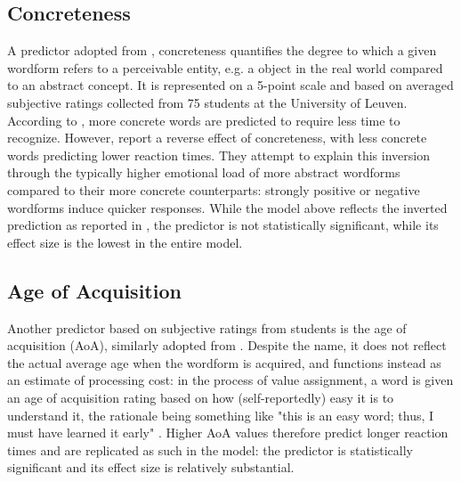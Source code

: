 \subsection{Concreteness} \label{subsec:concreteness}
A predictor adopted from \cite{Brysbaert+etal+2014}, concreteness quantifies the degree to which a given wordform refers to a perceivable entity, e.g. a object in the real world compared to an abstract concept. It is represented on a 5-point scale and based on averaged subjective ratings collected from 75 students at the University of Leuven. According to \cite{Brysbaert+etal+2014}, more concrete words are predicted to require less time to recognize. However, \cite{Brysbaert+etal+2016} report a reverse effect of concreteness, with less concrete words predicting lower reaction times. They attempt to explain this inversion through the typically higher emotional load of more abstract wordforms compared to their more concrete counterparts: strongly positive or negative wordforms induce quicker responses. While the model above reflects the inverted prediction as reported in \cite{Brysbaert+etal+2016}, the predictor is not statistically significant, while its effect size is the lowest in the entire model.
\subsection{Age of Acquisition} \label{subsec:aoa}
Another predictor based on subjective ratings from students is the age of acquisition (AoA), similarly adopted from \cite{Brysbaert+etal+2014}. Despite the name, it does not reflect the actual average age when the wordform is acquired, and functions instead as an estimate of processing cost: in the process of value assignment, a word is given an age of acquisition rating based on how (self-reportedly) easy it is to understand it, the rationale being something like "this is an easy word; thus, I must have learned it early" \parencite[p.23]{Brysbaert+etal+2016}. Higher AoA values therefore predict longer reaction times and are replicated as such in the model: the predictor is statistically significant and its effect size is relatively substantial.
